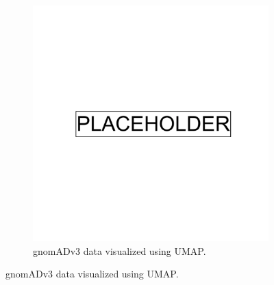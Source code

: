 \clearpage

\begin{figure}[h!]
  \centering
  \begin{subfigure}[b]{0.4\linewidth}
    \includegraphics[width=\linewidth]{placeholder.png}
    \caption{gnomADv3 data visualized using UMAP.}
    \label{fig:gnomAD_UMAP}
  \end{subfigure}


\end{figure}
